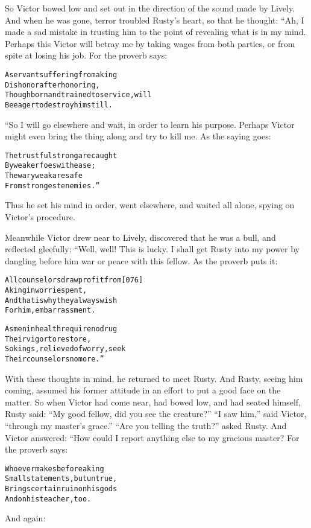 \documentclass{article}
\renewenvironment{verbatim}{\begin{alltt}\normalfont\begin{centering}}{\end{centering}\end{alltt}}
\begin{document}
So Victor bowed low and set out in the direction of the sound made
by Lively. And when he was gone, terror troubled Rusty's heart, so
that he thought: “Ah, I made a sad mistake in trusting him to the
point of revealing what is in my mind. Perhaps this Victor will
betray me by taking wages from both parties, or from spite at
losing his job. For the proverb says:

\begin{verbatim}
A servant suffering from a king
Dishonor after honoring,
Though born and trained to service, will
Be eager to destroy him still.
\end{verbatim}
“So I will go elsewhere and wait, in order to learn his purpose.
Perhaps Victor might even bring the thing along and try to kill me.
As the saying goes:

\begin{verbatim}
The trustful strong are caught
    By weaker foes with ease;
The wary weak are safe
    From strongest enemies.”
\end{verbatim}
Thus he set his mind in order, went elsewhere, and waited all
alone, spying on Victor's procedure.

Meanwhile Victor drew near to Lively, discovered that he was a
bull, and reflected gleefully: “Well, well! This is lucky. I shall
get Rusty into my power by dangling before him war or peace with
this fellow. As the proverb puts it:

\begin{verbatim}
All counselors draw profit from                         [076]
    A king in worries pent,
And that is why they always wish
    For him, embarrassment.

As men in health require no drug
    Their vigor to restore,
So kings, relieved of worry, seek
    Their counselors no more.”
\end{verbatim}
With these thoughts in mind, he returned to meet Rusty. And Rusty,
seeing him coming, assumed his former attitude in an effort to put
a good face on the matter. So when Victor had come near, had bowed
low, and had seated himself, Rusty said:
``My good fellow, did you see the creature?'' ``I saw him,'' said
Victor, ``through my master's grace.''
``Are you telling the truth?'' asked Rusty. And Victor answered:
“How could I report anything else to my gracious master? For the
proverb says:

\begin{verbatim}
Whoever makes before a king
    Small statements, but untrue,
Brings certain ruin on his gods
    And on his teacher, too.
\end{verbatim}
And again:
\end{document}

